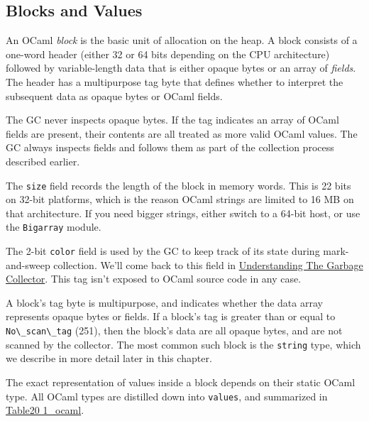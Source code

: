 \hypertarget{blocks-and-values}{%
\subsection{Blocks and Values}\label{blocks-and-values}}

An OCaml \emph{block} is the basic unit of allocation on the heap. A
block consists of a one-word header (either 32 or 64 bits depending on
the CPU architecture) followed by variable-length data that is either
opaque bytes or an array of \emph{fields}. The header has a multipurpose
tag byte that defines whether to interpret the subsequent data as opaque
bytes or OCaml fields.

The GC never inspects opaque bytes. If the tag indicates an array of
OCaml fields are present, their contents are all treated as more valid
OCaml values. The GC always inspects fields and follows them as part of
the collection process described earlier.

The \passthrough{\lstinline!size!} field records the length of the block
in memory words. This is 22 bits on 32-bit platforms, which is the
reason OCaml strings are limited to 16 MB on that architecture. If you
need bigger strings, either switch to a 64-bit host, or use the
\passthrough{\lstinline!Bigarray!} module.

The 2-bit \passthrough{\lstinline!color!} field is used by the GC to
keep track of its state during mark-and-sweep collection. We'll come
back to this field in
\href{garbage-collector.html\#understanding-the-garbage-collector}{Understanding
The Garbage Collector}. This tag isn't exposed to OCaml source code in
any case.

A block's tag byte is multipurpose, and indicates whether the data array
represents opaque bytes or fields. If a block's tag is greater than or
equal to \passthrough{\lstinline!No\_scan\_tag!} (251), then the block's
data are all opaque bytes, and are not scanned by the collector. The
most common such block is the \passthrough{\lstinline!string!} type,
which we describe in more detail later in this chapter.

The exact representation of values inside a block depends on their
static OCaml type. All OCaml types are distilled down into
\passthrough{\lstinline!values!}, and summarized in
\href{runtime-memory-layout.html\#table20-1_ocaml}{Table20 1\_ocaml}.~

